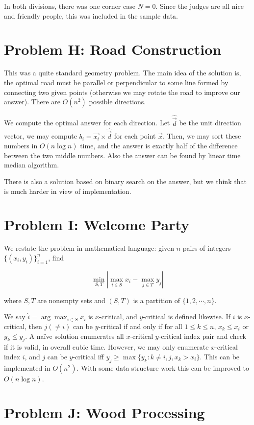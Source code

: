 \documentclass[a4paper,10.5pt,twoside]{article}
\begin{document}
In both divisions, there was one corner case $N = 0$. Since the judges are all nice and friendly people, this was included in the sample data.

\section*{Problem H: Road Construction}

This was a quite standard geometry problem. The main idea of the solution is, the optimal road must be parallel or perpendicular to some line formed by connecting two given points (otherwise we may rotate the road to improve our answer). There are $O(n^2)$ possible directions.

We compute the optimal answer for each direction. Let $\hat{\vec{d}}$ be the unit direction vector, we may compute $b_i = \vec{x_i} \times \hat{\vec{d}}$ for each point $\vec{x}$. Then, we may sort these numbers in $O(n \log n)$ time, and the answer is exactly half of the difference between the two middle numbers. Also the answer can be found by linear time median algorithm.

There is also a solution based on binary search on the answer, but we think that is much harder in view of implementation.

\section*{Problem I: Welcome Party}
 
We restate the problem in mathematical language: given $n$ pairs of integers $\{(x_i, y_i)\}_{i=1}^n$, find

$$ \min_{S, T} | \max_{i \in S} x_i - \max_{j \in T} y_j | $$

where $S, T$ are nonempty sets and $(S, T)$ is a partition of $\{1, 2, \cdots, n\}$.

We say $\hat{i} = \arg\max_{i \in S} x_i$ is $x$-critical, and $y$-critical is defined likewise. If $i$ is $x$-critical, then $j (\neq i)$ can be $y$-critical if and only if for all $1 \leq k \leq n$, $x_k \leq x_i$ or $y_k \leq y_j$. A na\"ive solution enumerates all $x$-critical $y$-critical index pair and check if it is valid, in overall cubic time. However, we may only enumerate $x$-critical index $i$, and $j$ can be $y$-critical iff $y_j \geq \max\{y_k : k \neq i, j, x_k > x_i\}$. This can be implemented in $O(n^2)$. With some data structure work this can be improved to $O(n \log n)$.

\section*{Problem J: Wood Processing}
\end{document}
